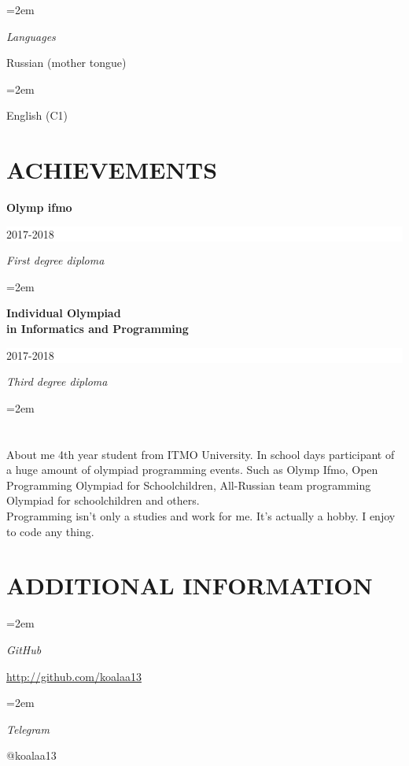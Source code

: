 \documentclass[paper=a4,fontsize=11pt]{scrartcl}	 			%
\newlength{\spacebox}
\newcommand{\sepspace}{\vspace*{1em}}			%
\newcommand{\NewPart}[1]{\section*{\uppercase{#1}}}
\newcommand{\PersonalEntry}[2]{
		\noindent\hangindent=2em\hangafter=0 		%
		\parbox{\spacebox}{						%
		\textit{#1}}								%
		\hspace{1.5em} #2 \par}					%
\newcommand{\SkillsEntry}[2]{						%
		\noindent\hangindent=2em\hangafter=0 		%
		\parbox{\spacebox}{						%
		\textit{#1}}								%
		\hspace{1.5em} #2 \par}					%
\newcommand{\EducationEntry}[4]{
		\noindent \textbf{#1} \hfill 					%
		\colorbox{White}{%
			\parbox{10em}{%
			\hfill\color{Black}#2}} \par				%
		\noindent \textit{#3} \par					%
		\noindent\hangindent=2em\hangafter=0 \small #4 	%
		\normalsize \par}
\begin{document}
\SkillsEntry{Languages}{Russian (mother tongue)}
\SkillsEntry{}{English (C1)}
\sepspace

\NewPart{Achievements}{}

\EducationEntry{Olymp ifmo}{2017-2018}{First degree diploma}
\sepspace
\EducationEntry{Individual Olympiad \\ in Informatics and Programming}{2017-2018}{Third degree diploma}

\NewPart{About me}{}
4th year student from ITMO University. In school days participant of a huge amount of olympiad programming events. Such as Olymp Ifmo, Open Programming Olympiad for Schoolchildren, All-Russian team programming Olympiad for schoolchildren and others. \\
Programming isn't only a studies and work for me. It's actually a hobby. I enjoy to code any thing. 

\sepspace
\NewPart{Additional information}{}

\SkillsEntry{GitHub}{\url{http://github.com/koalaa13}}
\SkillsEntry{Telegram}{@koalaa13}
\end{document}
